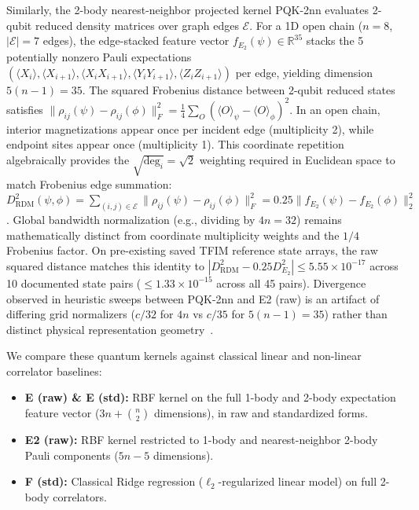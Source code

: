 \documentclass[conference]{IEEEtran}
\begin{document}
Similarly, the 2-body nearest-neighbor projected kernel PQK-2nn evaluates 2-qubit reduced density matrices over graph edges $\mathcal{E}$. For a 1D open chain ($n=8$, $|\mathcal{E}|=7$ edges), the edge-stacked feature vector $f_{E_2}(\psi) \in \mathbb{R}^{35}$ stacks the 5 potentially nonzero Pauli expectations $(\langle X_i \rangle, \langle X_{i+1} \rangle, \langle X_i X_{i+1} \rangle, \langle Y_i Y_{i+1} \rangle, \langle Z_i Z_{i+1} \rangle)$ per edge, yielding dimension $5(n-1) = 35$. The squared Frobenius distance between 2-qubit reduced states satisfies $\|\rho_{ij}(\psi) - \rho_{ij}(\phi)\|_F^2 = \frac{1}{4}\sum_{O} (\langle O \rangle_\psi - \langle O \rangle_\phi)^2$. In an open chain, interior magnetizations appear once per incident edge (multiplicity 2), while endpoint sites appear once (multiplicity 1). This coordinate repetition algebraically provides the $\sqrt{\text{deg}_i} = \sqrt{2}$ weighting required in Euclidean space to match Frobenius edge summation: $D^2_{\mathrm{RDM}}(\psi, \phi) = \sum_{(i,j) \in \mathcal{E}} \|\rho_{ij}(\psi) - \rho_{ij}(\phi)\|_F^2 = 0.25 \|f_{E_2}(\psi) - f_{E_2}(\phi)\|_2^2$. Global bandwidth normalization (e.g., dividing by $4n=32$) remains mathematically distinct from coordinate multiplicity weights and the $1/4$ Frobenius factor. On pre-existing saved TFIM reference state arrays, the raw squared distance matches this identity to $|D^2_{\mathrm{RDM}} - 0.25 D^2_{E_2}| \le 5.55 \times 10^{-17}$ across 10 documented state pairs ($\le 1.33 \times 10^{-15}$ across all 45 pairs). Divergence observed in heuristic sweeps between PQK-2nn and E2 (raw) is an artifact of differing grid normalizers ($c/32$ for $4n$ vs $c/35$ for $5(n-1)=35$) rather than distinct physical representation geometry~\cite{Canatar2023bandwidth}.

We compare these quantum kernels against classical linear and non-linear correlator baselines:
\begin{itemize}
    \item \textbf{E (raw) \& E (std):} RBF kernel on the full 1-body and 2-body expectation feature vector ($3n + \binom{n}{2}$ dimensions), in raw and standardized forms.
    \item \textbf{E2 (raw):} RBF kernel restricted to 1-body and nearest-neighbor 2-body Pauli components ($5n-5$ dimensions).
    \item \textbf{F (std):} Classical Ridge regression ($\ell_2$-regularized linear model) on full 2-body correlators.
\end{itemize}
\end{document}
